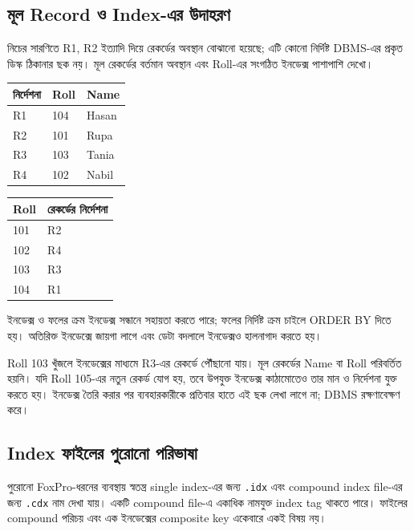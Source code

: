 \subsection{মূল Record ও Index-এর উদাহরণ}
নিচের সারণিতে R1, R2 ইত্যাদি দিয়ে রেকর্ডের অবস্থান বোঝানো হয়েছে; এটি কোনো নির্দিষ্ট DBMS-এর প্রকৃত ডিস্ক ঠিকানার ছক নয়। মূল রেকর্ডের বর্তমান অবস্থান এবং Roll-এর সংগঠিত ইনডেক্স পাশাপাশি দেখো।
\begin{flushleft}\small
\begin{tabular}{|l|l|l|}\hline
নির্দেশনা & Roll & Name\\\hline
R1 & 104 & Hasan\\\hline
R2 & 101 & Rupa\\\hline
R3 & 103 & Tania\\\hline
R4 & 102 & Nabil\\\hline
\end{tabular}\qquad
\begin{tabular}{|l|l|}\hline
Roll & রেকর্ডের নির্দেশনা\\\hline
101 & R2\\\hline102 & R4\\\hline103 & R3\\\hline104 & R1\\\hline
\end{tabular}
\end{flushleft}
\begin{flushleft}\centering\captionsetup{justification=centering}
\end{flushleft}
\begin{boardbox}{ইনডেক্স ও ফলের ক্রম}
ইনডেক্স সন্ধানে সহায়তা করতে পারে; ফলের নির্দিষ্ট ক্রম চাইলে ORDER BY দিতে হয়। অতিরিক্ত ইনডেক্সে জায়গা লাগে এবং ডেটা বদলালে ইনডেক্সও হালনাগাদ করতে হয়।
\end{boardbox}
Roll 103 খুঁজলে ইনডেক্সের মাধ্যমে R3-এর রেকর্ডে পৌঁছানো যায়। মূল রেকর্ডের Name বা Roll পরিবর্তিত হয়নি। যদি Roll 105-এর নতুন রেকর্ড যোগ হয়, তবে উপযুক্ত ইনডেক্স কাঠামোতেও তার মান ও নির্দেশনা যুক্ত করতে হয়। ইনডেক্স তৈরি করার পর ব্যবহারকারীকে প্রতিবার হাতে এই ছক লেখা লাগে না; DBMS রক্ষণাবেক্ষণ করে।

\subsection{Index ফাইলের পুরোনো পরিভাষা}
পুরোনো FoxPro-ধরনের ব্যবস্থায় স্বতন্ত্র single index-এর জন্য \texttt{.idx} এবং compound index file-এর জন্য \texttt{.cdx} নাম দেখা যায়। একটি compound file-এ একাধিক নামযুক্ত index tag থাকতে পারে। ফাইলের compound পরিচয় এবং এক ইনডেক্সের composite key একেবারে একই বিষয় নয়।

